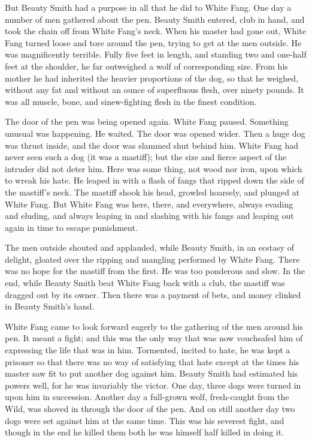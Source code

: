 \documentclass[10pt]{book}
\begin{document}
But Beauty Smith had a purpose in all that he did to White Fang. One
day a number of men gathered about the pen. Beauty Smith entered, club
in hand, and took the chain off from White Fang’s neck. When his master
had gone out, White Fang turned loose and tore around the pen, trying
to get at the men outside. He was magnificently terrible. Fully five
feet in length, and standing two and one-half feet at the shoulder, he
far outweighed a wolf of corresponding size. From his mother he had
inherited the heavier proportions of the dog, so that he weighed,
without any fat and without an ounce of superfluous flesh, over ninety
pounds. It was all muscle, bone, and sinew-fighting flesh in the finest
condition.

The door of the pen was being opened again. White Fang paused.
Something unusual was happening. He waited. The door was opened wider.
Then a huge dog was thrust inside, and the door was slammed shut behind
him. White Fang had never seen such a dog (it was a mastiff); but the
size and fierce aspect of the intruder did not deter him. Here was some
thing, not wood nor iron, upon which to wreak his hate. He leaped in
with a flash of fangs that ripped down the side of the mastiff’s neck.
The mastiff shook his head, growled hoarsely, and plunged at White
Fang. But White Fang was here, there, and everywhere, always evading
and eluding, and always leaping in and slashing with his fangs and
leaping out again in time to escape punishment.

The men outside shouted and applauded, while Beauty Smith, in an
ecstasy of delight, gloated over the ripping and mangling performed by
White Fang. There was no hope for the mastiff from the first. He was
too ponderous and slow. In the end, while Beauty Smith beat White Fang
back with a club, the mastiff was dragged out by its owner. Then there
was a payment of bets, and money clinked in Beauty Smith’s hand.

White Fang came to look forward eagerly to the gathering of the men
around his pen. It meant a fight; and this was the only way that was
now vouchsafed him of expressing the life that was in him. Tormented,
incited to hate, he was kept a prisoner so that there was no way of
satisfying that hate except at the times his master saw fit to put
another dog against him. Beauty Smith had estimated his powers well,
for he was invariably the victor. One day, three dogs were turned in
upon him in succession. Another day a full-grown wolf, fresh-caught
from the Wild, was shoved in through the door of the pen. And on still
another day two dogs were set against him at the same time. This was
his severest fight, and though in the end he killed them both he was
himself half killed in doing it.
\end{document}
